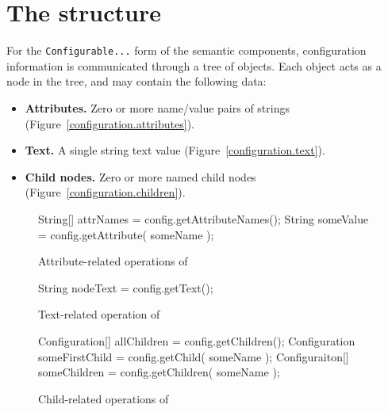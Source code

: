 \section{The  structure}

For the \texttt{Configurable...} form of the semantic components, 
configuration information is communicated through a tree of
 objects.  Each 
object acts as a node in the tree, and may contain the following
data:

\begin{itemize}
  \item \textbf{Attributes.} Zero or more name/value pairs of strings
(Figure~\vref{configuration.attributes}).
  \item \textbf{Text.} A single string text value
(Figure~\vref{configuration.text}).
  \item \textbf{Child  nodes.} Zero or more named
    child  nodes
(Figure~\vref{configuration.children}).
\end{itemize}

\begin{figure}
\begin{javaCodelisting}
String[] attrNames = config.getAttributeNames();
String   someValue = config.getAttribute( someName );
\end{javaCodelisting}
\caption{Attribute-related operations of }
\label{configuration.attributes}
\end{figure}

\begin{figure}
\begin{javaCodelisting}
String nodeText = config.getText();
\end{javaCodelisting}
\caption{Text-related operation of }
\label{configuration.text}
\end{figure}

\begin{figure}
\begin{javaCodelisting}
Configuration[] allChildren    = config.getChildren();
Configuration   someFirstChild = config.getChild( someName );
Configuraiton[] someChildren   = config.getChildren( someName );
\end{javaCodelisting}
\caption{Child-related operations of }
\label{configuration.children}
\end{figure}

